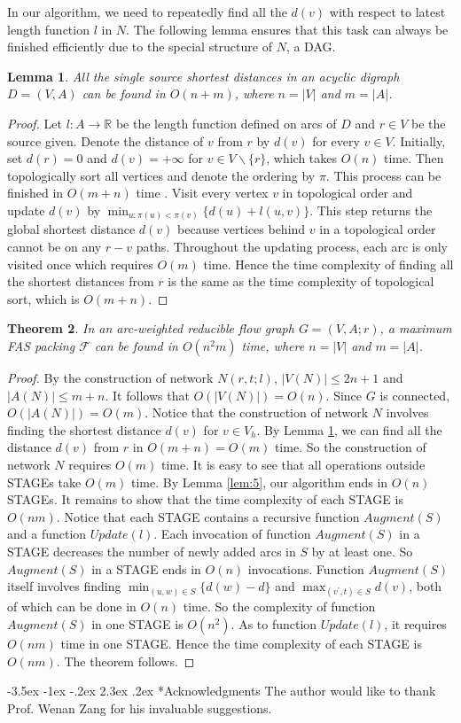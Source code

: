 \documentclass[11pt]{article}
\makeatletter
\newtheorem{theorem}{Theorem}[section]
\newtheorem{lemma}[theorem]{Lemma}
\renewcommand\section{%
  \@startsection{section}{1}
                {\z@}%
                {-3.5ex \@plus -1ex \@minus -.2ex}%
                {2.3ex \@plus.2ex}%
                {\large\bfseries}%
}
\makeatother
\begin{document}
In our algorithm, we need to repeatedly find all the $d(v)$ with respect to latest length function $l$ in $N$. The following lemma ensures that this task can always be finished efficiently due to the special structure of $N$, a DAG.

\begin{lemma}
\label{lem:6}
All the single source shortest distances in an acyclic digraph $D=(V,A)$ can be found in $O(n+m)$, where $n=\lvert V \rvert$ and $m=\lvert A \rvert$.
\end{lemma}
\begin{proof}
Let $l:A\rightarrow \mathbb{R}$ be the length function defined on arcs of $D$ and $r\in V$ be the source given. Denote the distance of $v$ from $r$ by $d(v)$ for every $v\in V$. Initially, set $d(r)=0$ and $d(v)=+\infty$ for $v\in V\backslash \{r\}$, which takes $O(n)$ time. Then topologically sort all vertices and denote the ordering by $\pi$. This process can be finished in $O(m+n)$ time \cite{AhMO}. Visit every vertex $v$ in topological order and update $d(v)$ by $\min_{u:\pi(u)<\pi(v)}\{d(u)+l(u,v)\}$. This step returns the global shortest distance $d(v)$ because vertices behind $v$ in a topological order cannot be on any $r-v$ paths. Throughout the updating process, each arc is only visited once which requires $O(m)$ time. Hence the time complexity of finding all the shortest distances from $r$ is the same as the time complexity of topological sort, which is $O(m+n)$.
\end{proof}

\begin{theorem}
\label{thm:5}
In an arc-weighted reducible flow graph $G=(V,A;r)$, a maximum FAS packing $\mathcal{F}$ can be found in $O(n^2 m)$ time, where $n=\lvert V \rvert$ and $m=\lvert A \rvert$.
\end{theorem}
\begin{proof}
By the construction of network $N(r,t;l)$, $\lvert V(N)\rvert\leq 2n+1$ and $\lvert A(N)\rvert\leq m+n$. It follows that $O(\lvert V(N)\rvert)=O(n)$. Since $G$ is connected, $O(\lvert A(N)\rvert)=O(m)$. Notice that the construction of network $N$ involves finding the shortest distance $d(v)$ for $v\in V_h$. By Lemma \ref{lem:6}, we can find all the distance $d(v)$ from $r$ in $O(m+n)=O(m)$ time. So the construction of network $N$ requires $O(m)$ time. It is easy to see that all operations outside STAGEs take $O(m)$ time. By Lemma \ref{lem:5}, our algorithm ends in $O(n)$ STAGEs. It remains to show that the time complexity of each STAGE is $O(nm)$. Notice that each STAGE contains a recursive function $Augment(S)$ and a function $Update(l)$. Each invocation of function $Augment(S)$ in a STAGE decreases the number of newly added arcs in $S$ by at least one. So $Augment(S)$ in a STAGE ends in $O(n)$ invocations. Function $Augment(S)$ itself involves finding $\min_{(u,w)\in S}\{d(w)-d\}$ and $\max_{(v^\prime,t)\in S} d(v)$, both of which can be done in $O(n)$ time. So the complexity of function $Augment(S)$ in one STAGE is $O(n^2)$. As to function $Update(l)$, it requires $O(nm)$ time in one STAGE. Hence the time complexity of each STAGE is $O(nm)$. The theorem follows.
\end{proof}

\section*{Acknowledgments}
The author would like to thank Prof. Wenan Zang for his invaluable suggestions.



\nocite{CDHZ,DinZ,HecU2,Sham}
\end{document}
